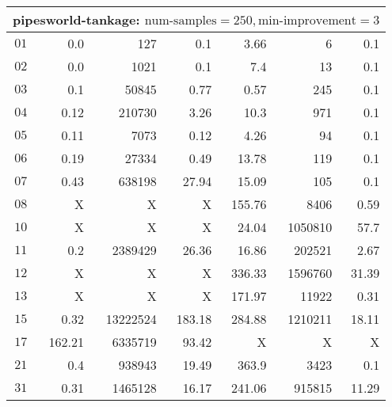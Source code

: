\begin{longtable}{|c||r|r|r||r|r|r|}
\multicolumn{7}{|l|}{pipesworld-tankage: $\text{num-samples}=250,\text{min-improvement}=3$}\\\hline
$01$ & 0.0 & 127 & 0.1 &3.66 & 6 & 0.1 \\\hline
$02$ & 0.0 & 1021 & 0.1 &7.4 & 13 & 0.1 \\\hline
$03$ & 0.1 & 50845 & 0.77 &0.57 & 245 & 0.1 \\\hline
$04$ & 0.12 & 210730 & 3.26 &10.3 & 971 & 0.1 \\\hline
$05$ & 0.11 & 7073 & 0.12 &4.26 & 94 & 0.1 \\\hline
$06$ & 0.19 & 27334 & 0.49 &13.78 & 119 & 0.1 \\\hline
$07$ & 0.43 & 638198 & 27.94 &15.09 & 105 & 0.1 \\\hline
$08$ & X & X & X &155.76 & 8406 & 0.59 \\\hline
$10$ & X & X & X &24.04 & 1050810 & 57.7 \\\hline
$11$ & 0.2 & 2389429 & 26.36 &16.86 & 202521 & 2.67 \\\hline
$12$ & X & X & X &336.33 & 1596760 & 31.39 \\\hline
$13$ & X & X & X &171.97 & 11922 & 0.31 \\\hline
$15$ & 0.32 & 13222524 & 183.18 &284.88 & 1210211 & 18.11 \\\hline
$17$ & 162.21 & 6335719 & 93.42 &X & X & X \\\hline
$21$ & 0.4 & 938943 & 19.49 &363.9 & 3423 & 0.1 \\\hline
$31$ & 0.31 & 1465128 & 16.17 &241.06 & 915815 & 11.29 \\\hline


\end{longtable}
